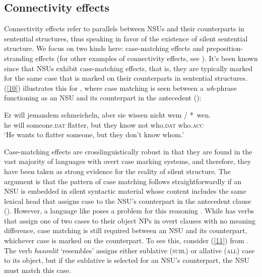 \subsection{Connectivity effects}
\label{sec-connectivity-effects}

Connectivity effects refer to parallels between NSUs and their counterparts in sentential structures, thus speaking in favor of the existence of silent sentential structure. We focus on two kinds here: case-matching effects and preposition-stranding effects (for other examples of connectivity effects, see \citealt{Ginzburg2018}). It's been known since \citet{Ross1967} that NSUs exhibit case-matching effects, that is, they are typically marked for the same case that is marked on their counterparts in sentential structures. (\ref{10}) illustrates this for , where case matching is seen between a \emph{wh}-phrase functioning as an NSU and its counterpart in the antecedent (\citealt[663]{Merchant2005-proc}):

\ea
\gll Er will jemandem schmeicheln, aber sie wissen nicht wem / *~wen.\\
     he will someone.\textsc{dat} flatter, but they know not who.\textsc{dat} {}  \hphantom{*~}who.\textsc{acc}\\
\glt `He wants to flatter someone, but they don't know whom.'\label{10}\z


Case-matching effects are crosslinguistically robust in that they are found in the vast majority of languages with overt case marking systems, and therefore, they have been taken as strong evidence for the reality of silent structure. The argument is that the pattern of case matching follows straightforwardly if an NSU is embedded in silent syntactic material whose content includes the same lexical head that assigns case to the NSU's counterpart in the antecedent clause (\citealt{Merchant2001, Merchant2005a}). However, a language like  poses a problem for this reasoning \citep{Jacobson2016}. While  has verbs that assign one of two cases to their object NPs in overt clauses with no meaning difference, case matching is still required between an NSU and its counterpart, whichever case is marked on the counterpart. To see this, consider (\ref{11}) from \citet[356]{Jacobson2016}. The verb \emph{hasonlit} `resembles' assigns either sublative (\textsc{subl}) or allative (\textsc{all}) case to its object, but if  the sublative is selected for an NSU's counterpart, the NSU  must match this case.

